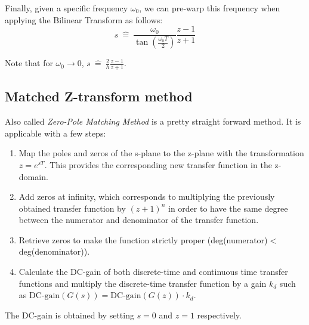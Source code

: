 \documentclass[10pt,a4paper]{article}
\begin{document}
Finally, given a specific frequency $\omega_0$, we can pre-warp this frequency when applying the Bilinear Transform as follows: 
$$
\boxed{
s \: \hat{=} \: \frac{\omega_0}{\tan\left(\frac{\omega_0 T}{2}\right)} \frac{z-1}{z+1} 
}
$$

Note that for $\omega_0 \rightarrow 0$, $s \: \hat{=} \: \frac{2}{h} \frac{z-1}{z+1}$. 

\subsection{Matched Z-transform method}
Also called \emph{Zero-Pole Matching Method} is a pretty straight forward method. It is applicable with a few steps:
\begin{enumerate}
\item Map the poles and zeros of the s-plane to the z-plane with the transformation $z = e^{sT}$. This provides the corresponding new transfer function in the z-domain. 
\item Add zeros at infinity, which corresponds to multiplying the previously obtained transfer function by $(z+1)^n$ in order to have the same degree between the numerator and denominator of the transfer function. 
\item Retrieve zeros to make the function strictly proper (deg(numerator)$<$deg(denominator)). 
\item Calculate the DC-gain of both discrete-time and continuous time transfer functions and multiply the discrete-time transfer function by a gain $k_d$ such as $\text{DC-gain}(G(s)) = \text{DC-gain}(G(z)) \cdot k_d$.
\end{enumerate}

The DC-gain is obtained by setting $s = 0$ and $z = 1$ respectively. 
\end{document}

